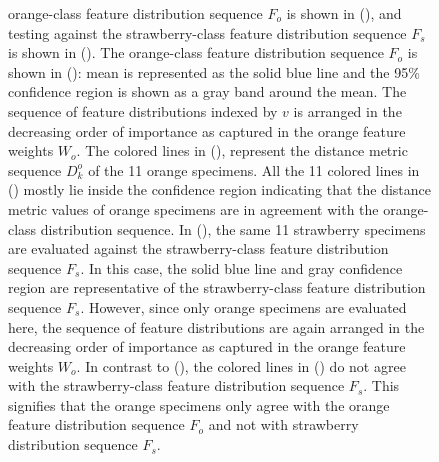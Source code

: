 \documentclass {udthesis}
\begin{document}
\begin{figure}
{orange-class feature distribution sequence $F_o$ is shown in 
(), and testing against the
strawberry-class feature distribution sequence $F_s$ is shown in
(). 
The orange-class feature distribution sequence $F_o$ is shown in (): mean is represented as the solid blue line and the 95\% confidence region is shown as a gray band around the mean. The sequence of feature distributions indexed by $v$ is arranged in the decreasing order of importance as captured in the orange feature weights $W_o$. The colored lines in (), represent the distance metric sequence $D^o_k$ of the 11 orange specimens. All the 11 colored lines in () mostly lie inside the confidence region indicating that the distance metric values of orange specimens are in agreement with the orange-class distribution sequence.
In (), the same 11 strawberry specimens are evaluated against the strawberry-class feature distribution sequence $F_s$. In this case, the solid blue line and gray confidence region are representative of the strawberry-class feature distribution sequence $F_s$. However, since only orange specimens are evaluated here, the sequence of feature distributions are again arranged in the decreasing order of importance as captured in the orange feature weights $W_o$. In contrast to (), the colored lines in () do not agree with the strawberry-class feature distribution sequence $F_s$. This signifies that the orange specimens only agree with the orange feature distribution sequence $F_o$ and not with strawberry distribution sequence $F_s$.}
\label{fig:feat_results_orange_test}
\end{figure}	
%
\end{document}
